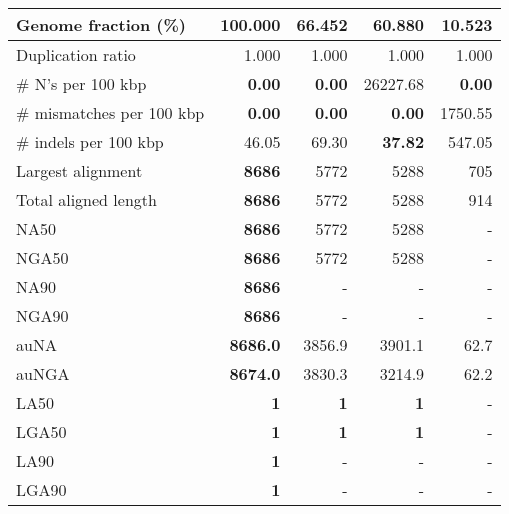 \documentclass[12pt,a4paper]{article}
\begin{document}
\begin{table}[ht]
\begin{center}
\begin{tabular}{|l*{4}{|r}|}
Genome fraction (\%) & {\bf 100.000} & 66.452 & 60.880 & 10.523 \\ \hline
Duplication ratio & 1.000 & 1.000 & 1.000 & 1.000 \\ \hline
\# N's per 100 kbp & {\bf 0.00} & {\bf 0.00} & 26227.68 & {\bf 0.00} \\ \hline
\# mismatches per 100 kbp & {\bf 0.00} & {\bf 0.00} & {\bf 0.00} & 1750.55 \\ \hline
\# indels per 100 kbp & 46.05 & 69.30 & {\bf 37.82} & 547.05 \\ \hline
Largest alignment & {\bf 8686} & 5772 & 5288 & 705 \\ \hline
Total aligned length & {\bf 8686} & 5772 & 5288 & 914 \\ \hline
NA50 & {\bf 8686} & 5772 & 5288 & - \\ \hline
NGA50 & {\bf 8686} & 5772 & 5288 & - \\ \hline
NA90 & {\bf 8686} & - & - & - \\ \hline
NGA90 & {\bf 8686} & - & - & - \\ \hline
auNA & {\bf 8686.0} & 3856.9 & 3901.1 & 62.7 \\ \hline
auNGA & {\bf 8674.0} & 3830.3 & 3214.9 & 62.2 \\ \hline
LA50 & {\bf 1} & {\bf 1} & {\bf 1} & - \\ \hline
LGA50 & {\bf 1} & {\bf 1} & {\bf 1} & - \\ \hline
LA90 & {\bf 1} & - & - & - \\ \hline
LGA90 & {\bf 1} & - & - & - \\ \hline
\end{tabular}
\end{center}
\end{table}
\end{document}
